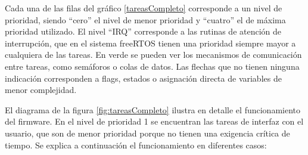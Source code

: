 Cada una de las filas del gráfico \ref{tareasCompleto} corresponde a un nivel de prioridad, siendo “cero” el nivel de menor prioridad y “cuatro” el de máxima prioridad utilizado. El nivel “IRQ” corresponde a las rutinas de atención de interrupción, que en el sistema freeRTOS tienen una prioridad siempre mayor a cualquiera de las tareas. En verde se pueden ver los mecanismos de comunicación entre tareas, como semáforos o colas de datos. Las flechas que no tienen ninguna indicación corresponden a flags, estados o asignación directa de variables de menor complejidad. 
	
El diagrama de la figura \ref{fig:tareasCompleto} ilustra en detalle el funcionamiento del firmware. En el nivel de prioridad 1 se encuentran las tareas de interfaz con el usuario, que son de menor prioridad porque no tienen una exigencia crítica de tiempo. Se explica a continuación el funcionamiento en diferentes casos:

